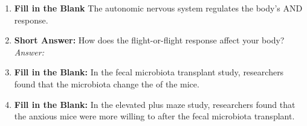 \begin{enumerate}[label=\textbf{Q1.1.\arabic*}]
      \item \textbf{Fill in the Blank} The autonomic nervous system regulates the body's \underline{\hspace{3cm}} AND \underline{\hspace{3cm}} response. \\

      \item \textbf{Short Answer:} How does the flight-or-flight response affect your body? \\
            \textit{Answer:} \\%

      \item \textbf{Fill in the Blank:} In the fecal microbiota transplant study, researchers found that the microbiota change the \underline{\hspace{3cm}} of the mice. \\

      \item \textbf{Fill in the Blank:} In the elevated plus maze study, researchers found that the anxious mice were more willing to \underline{\hspace{3cm}} after the fecal microbiota transplant. \\
\end{enumerate}
\squigglyline

